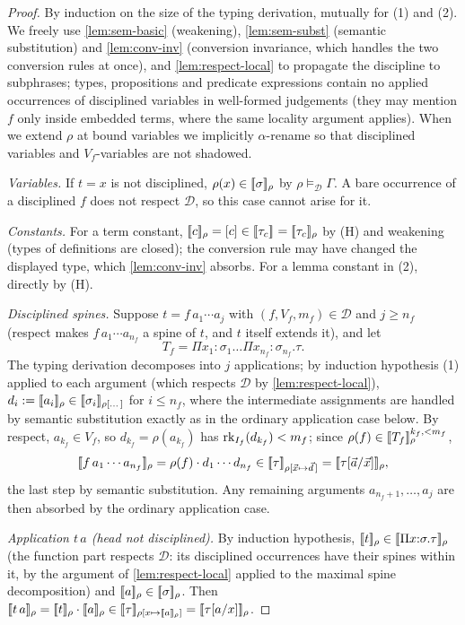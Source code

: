 \begin{proof}
By induction on the size of the typing derivation, mutually for (1) and
(2).  We freely use \cref{lem:sem-basic} (weakening),
\cref{lem:sem-subst} (semantic substitution) and \cref{lem:conv-inv}
(conversion invariance, which handles the two conversion rules at once),
and \cref{lem:respect-local} to propagate the discipline to subphrases;
types, propositions and predicate expressions contain no applied
occurrences of disciplined variables in well-formed judgements (they may
mention $f$ only inside embedded terms, where the same locality argument
applies).  When we extend $\rho$ at bound variables we implicitly
$\alpha$-rename so that disciplined variables and $V_f$-variables are not
shadowed.

\emph{Variables.}  If $t = x$ is not disciplined, $\rho(x) \in
[\![ \sigma ]\!]_{\rho}$ by $\rho \vDash_{\mathcal{D}} \Gamma$.  A bare
occurrence of a disciplined $f$ does not respect $\mathcal{D}$, so this
case cannot arise for it.

\emph{Constants.}  For a term constant, $[\![ c ]\!]_\rho = [c] \in
[\![ \tau_c ]\!]_{} = [\![ \tau_c ]\!]_{\rho}$ by (H) and weakening (types of
definitions are closed); the conversion rule may have changed the
displayed type, which \cref{lem:conv-inv} absorbs.  For a lemma constant
in (2), directly by (H).

\emph{Disciplined spines.}  Suppose $t = f\,a_1 \cdots a_j$ with $(f,
V_f, m_f) \in \mathcal{D}$ and $j \geq n_f$ (respect makes $f\,a_1\cdots
a_{n_f}$ a spine of $t$, and $t$ itself extends it), and let
\[
  T_f = \Pi x_1{:}\sigma_1 \dots \Pi x_{n_f}{:}\sigma_{n_f}.\tau.
\]  The typing
derivation decomposes into $j$ applications; by induction hypothesis (1)
applied to each argument (which respects $\mathcal{D}$ by
\cref{lem:respect-local}), $d_i \mathrel{:=} [\![ a_i ]\!]_\rho \in
[\![ \sigma_i ]\!]_{\rho[\dots]}$ for $i \leq n_f$, where the intermediate
assignments are handled by semantic substitution exactly as in the
ordinary application case below.  By respect, $a_{k_f} \in V_f$, so
$d_{k_f} = \rho(a_{k_f})$ has $\mathrm{rk}_{I_f}(d_{k_f}) < m_f$; since
$\rho(f) \in [\![ T_f ]\!]_{\rho}^{k_f, <m_f}$,
\[
  [\![ f\,a_1 \cdots a_{n_f} ]\!]_\rho = \rho(f) \cdot d_1 \cdots d_{n_f}
  \in [\![ \tau ]\!]_{\rho[\vec{x} \mapsto \vec{d}\,]}
  = [\![ \tau[\vec{a}/\vec{x}] ]\!]_{\rho},
\]
the last step by semantic substitution.  Any remaining arguments
$a_{n_f + 1}, \dots, a_j$ are then absorbed by the ordinary application
case.

\emph{Application $t\,a$ (head not disciplined).}  By induction
hypothesis, $[\![ t ]\!]_\rho \in [\![ \Pi x{:}\sigma.\tau ]\!]_{\rho}$ (the
function part respects $\mathcal{D}$: its disciplined occurrences have
their spines within it, by the argument of \cref{lem:respect-local}
applied to the maximal spine decomposition) and $[\![ a ]\!]_\rho \in
[\![ \sigma ]\!]_{\rho}$.  Then $\sem{t\,a}_\rho = \sem{t}_\rho \cdot
\sem{a}_\rho \in \semr{\tau}{\rho[x \mapsto \sem{a}_\rho]} =
\semr{\subst{\tau}{a}{x}}{\rho}$.


\end{proof}
